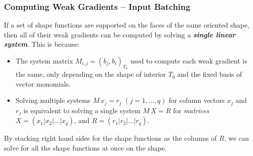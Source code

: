 \documentclass[compress]{beamer}
\begin{document}
\begin{frame}
  \frametitle{Computing Weak Gradients -- Input Batching}
  If a set of shape functions are supported on the faces of the same oriented shape, then all of their weak gradients
  can be computed by solving a \emph{\textbf{single linear system}}. This is because:
  \pause
  \begin{itemize}[<+->]
    \item The system matrix $M_{i,j} = (b_j, b_i)_{T_0}$ used to compute each weak gradient is the same, only depending
      on the shape of interior $T_0$ and the fixed basis of vector monomials.
    \item Solving multiple systems $M\,x_j = r_j$ {\scriptsize $(j=1,\dots,q)$} for column vectors $x_j$ and $r_j$
      is equivalent to solving a single system $M\,X = R$ for \emph{matrices}
      $X = (x_1|x_2|\dots|x_q)$, and $R = (r_1|r_2|\dots|r_q)$.
  \end{itemize}
  \uncover<+-> {
    \uncover<+-> {
      By stacking right hand sides for the shape functions as the columns of $R$, we can solve for all the shape functions at once on 
      the shape.
    }
  }
\end{frame}
\end{document}
